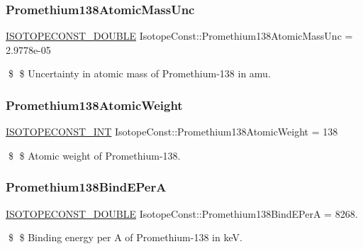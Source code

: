 \subsubsection{\texorpdfstring{Promethium138\+Atomic\+Mass\+Unc}{Promethium138AtomicMassUnc}}
{\footnotesize\ttfamily \mbox{\hyperlink{group___isotope_const-_macros_ga8f45a7272ce02c0b4c65c44636ed719a}{I\+S\+O\+T\+O\+P\+E\+C\+O\+N\+S\+T\+\_\+\+D\+O\+U\+B\+LE}} Isotope\+Const\+::\+Promethium138\+Atomic\+Mass\+Unc = 2.\+9778e-\/05}

\$ \$ Uncertainty in atomic mass of Promethium-\/138 in amu. \mbox{\label{group___isotope_const-_promethium-_pm138_ga43ca2c17019b5718126419973ca245c9}} 
\subsubsection{\texorpdfstring{Promethium138\+Atomic\+Weight}{Promethium138AtomicWeight}}
{\footnotesize\ttfamily \mbox{\hyperlink{group___isotope_const-_macros_ga5f18360b3e99483a35c32d789e62621c}{I\+S\+O\+T\+O\+P\+E\+C\+O\+N\+S\+T\+\_\+\+I\+NT}} Isotope\+Const\+::\+Promethium138\+Atomic\+Weight = 138}

\$ \$ Atomic weight of Promethium-\/138. \mbox{\label{group___isotope_const-_promethium-_pm138_ga49d031e918e124153b5d39e87b841766}} 
\subsubsection{\texorpdfstring{Promethium138\+Bind\+E\+PerA}{Promethium138BindEPerA}}
{\footnotesize\ttfamily \mbox{\hyperlink{group___isotope_const-_macros_ga8f45a7272ce02c0b4c65c44636ed719a}{I\+S\+O\+T\+O\+P\+E\+C\+O\+N\+S\+T\+\_\+\+D\+O\+U\+B\+LE}} Isotope\+Const\+::\+Promethium138\+Bind\+E\+PerA = 8268.}

\$ \$ Binding energy per A of Promethium-\/138 in keV. \mbox{\label{group___isotope_const-_promethium-_pm138_ga45ba5de19e245af54895847bd034547b}} 
